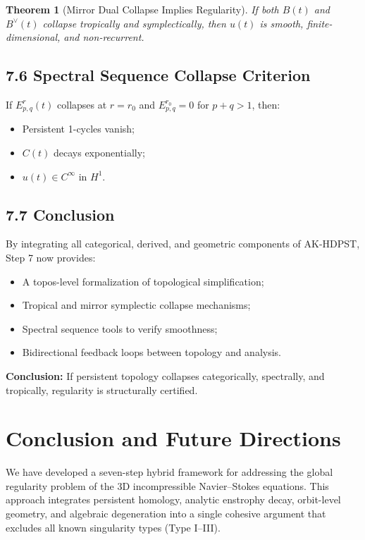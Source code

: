\documentclass[11pt]{article}
\newtheorem{theorem}{Theorem}[section]
\theoremstyle{definition}
\begin{document}
\begin{theorem}[Mirror Dual Collapse Implies Regularity]
If both $B(t)$ and $B^\vee(t)$ collapse tropically and symplectically, then $u(t)$ is smooth, finite-dimensional, and non-recurrent.
\end{theorem}

\subsection*{7.6 Spectral Sequence Collapse Criterion}

If $E^r_{p,q}(t)$ collapses at $r = r_0$ and $E^{r_0}_{p,q}=0$ for $p+q>1$, then:
\begin{itemize}
  \item Persistent 1-cycles vanish;
  \item $C(t)$ decays exponentially;
  \item $u(t) \in C^\infty$ in $H^1$.
\end{itemize}

\subsection*{7.7 Conclusion}

By integrating all categorical, derived, and geometric components of AK-HDPST, Step 7 now provides:
\begin{itemize}
  \item A topos-level formalization of topological simplification;
  \item Tropical and mirror symplectic collapse mechanisms;
  \item Spectral sequence tools to verify smoothness;
  \item Bidirectional feedback loops between topology and analysis.
\end{itemize}
\textbf{Conclusion:} If persistent topology collapses categorically, spectrally, and tropically, regularity is structurally certified.




\section{Conclusion and Future Directions}

We have developed a seven-step hybrid framework for addressing the global regularity problem of the 3D incompressible Navier--Stokes equations. This approach integrates persistent homology, analytic enstrophy decay, orbit-level geometry, and algebraic degeneration into a single cohesive argument that excludes all known singularity types (Type I--III).
\end{document}
